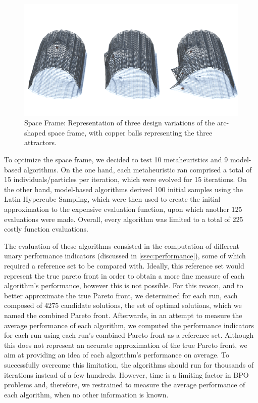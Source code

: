 \begin{figure}[htbp]
	\centering
	\includegraphics[width=1\textwidth]{Images/Evaluation/truss-kat.png}
	\caption[Space Frame: Representation of three space frame design variants]{Space Frame: Representation of three design variations of the arc-shaped space frame, with copper balls representing the three attractors.}
	\label{fig:spaceframe}
\end{figure}

To optimize the space frame, we decided to test 10 metaheuristics and 9 model-based algorithms. On the one hand, each metaheuristic ran comprised a total of 15 individuals/particles per iteration, which were evolved for 15 iterations. On the other hand, model-based algorithms derived 100 initial samples using the Latin Hypercube Sampling, which were then used to create the initial approximation to the expensive evaluation function, upon which another 125 evaluations were made. Overall, every algorithm was limited to a total of 225 costly function evaluations. 

The evaluation of these algorithms consisted in the computation of different unary performance indicators (discussed in \cref{ssec:performance}), some of which required a reference set to be compared with. Ideally, this reference set would represent the true pareto front in order to obtain a more fine measure of each algorithm's performance, however this is not possible. For this reason, and to better approximate the true Pareto front, we determined for each run, each composed of 4275 candidate solutions, the set of optimal solutions, which we named the combined Pareto front. Afterwards, in an attempt to measure the average performance of each algorithm, we computed the performance indicators for each run using each run's combined Pareto front as a reference set. Although this does not represent an accurate approximation of the true Pareto front, we aim at providing an idea of each algorithm's performance on average. To successfully overcome this limitation, the algorithms should run for thousands of iterations instead of a few hundreds. However, time is a limiting factor in \ac{BPO} problems and, therefore, we restrained to measure the average performance of each algorithm, when no other information is known.

